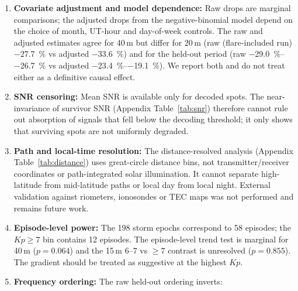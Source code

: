 \documentclass{agujournal2019}
\begin{document}
\begin{enumerate}
	      analysis), since that period is fully mature. We therefore treat
	      the absolute loss as compatible with network-related scaling but
	      not conclusively established: the point estimate 1.44 exceeds the
	      $\approx$1.35 expected from the $\SI{+35}{\percent}$ quiet-baseline
	      growth, but the wide CI is compatible with both proportional growth
	      and invariance. Percentage drops remain the more stable metric. Archival reproduction of the initial snapshot-based
	      numbers is available at the v1.1.0 release tag; the present
	      manuscript uses the live re-download (tag v1.5.0).
	\item \textbf{Covariate adjustment and model dependence:} Raw drops are
	      marginal comparisons; the adjusted drops from the negative-binomial
	      model depend on the choice of month, UT-hour and day-of-week
	      controls. The raw and adjusted estimates agree for 40\,m but differ
	      for 20\,m (raw (flare-included run) \SI{-27.7}{\percent} vs adjusted
	      \SI{-33.6}{\percent}) and for the held-out period (raw
	      \SIrange{-29.0}{-26.7}{\percent} vs adjusted
	      \SIrange{-23.4}{-19.1}{\percent}). We report both and do not treat
	      either as a definitive causal effect.
	\item \textbf{SNR censoring:} Mean SNR is available only for decoded
	      spots. The near-invariance of survivor SNR (Appendix
	      Table~\ref{tab:snr}) therefore cannot rule out absorption of
	      signals that fell below the decoding threshold; it only shows that
	      surviving spots are not uniformly degraded.
	\item \textbf{Path and local-time resolution:} The distance-resolved
	      analysis (Appendix Table~\ref{tab:distance}) uses great-circle
	      distance bins, not transmitter/receiver coordinates or
	      path-integrated solar illumination. It cannot separate
	      high-latitude from mid-latitude paths or local day from local
	      night. External validation against riometers, ionosondes or TEC
	      maps was not performed and remains future work.
	\item \textbf{Episode-level power:} The 198 storm epochs correspond to
	      58 episodes; the $Kp \ge 7$ bin contains 12 episodes. The
	      episode-level trend test is marginal for 40\,m ($p = 0.064$) and
	      the 15\,m $6\text{--}7$ vs $\ge 7$ contrast is unresolved
	      ($p = 0.855$). The gradient should be treated as suggestive at the
	      highest $Kp$.
	\item \textbf{Frequency ordering:} The raw held-out ordering inverts:

\end{enumerate}
\end{document}
